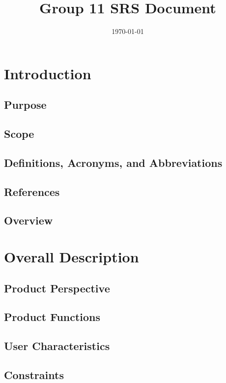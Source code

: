 \documentclass[12pt, titlepage]{article}
\title{Group 11 SRS Document}
\author{}
\date{\today}
\begin{document}
\maketitle

\tableofcontents
\listoftables
\listoffigures

\newpage


\section{Introduction}

  \subsection{Purpose}
  \subsection{Scope}
  \subsection{Definitions, Acronyms, and Abbreviations}
  \subsection{References}
  \subsection{Overview}

\section{Overall Description}

  \subsection{Product Perspective}
  \subsection{Product Functions}
  \subsection{User Characteristics}
  \subsection{Constraints}
\end{document}
